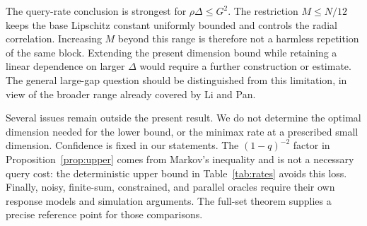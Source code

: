 \documentclass[11pt,a4paper]{article}
\theoremstyle{definition}
\numberwithin{equation}{section}
\begin{document}
The query-rate conclusion is strongest for $\rho\Delta\le G^2$. The
restriction $M\le N/12$ keeps the base Lipschitz constant uniformly bounded
and controls the radial correlation. Increasing $M$ beyond this range is
therefore not a harmless repetition of the same block. Extending the
present dimension bound while retaining a linear dependence on larger
$\Delta$ would require a further construction or estimate. The general
large-gap question should be distinguished from this limitation, in view
of the broader range already covered by Li and Pan.

Several issues remain outside the present result. We do not determine the
optimal dimension needed for the lower bound, or the minimax rate at a
prescribed small dimension. Confidence is fixed in our statements. The
$(1-q)^{-2}$ factor in Proposition~\ref{prop:upper} comes from Markov's
inequality and is not a necessary query cost: the deterministic upper
bound in Table~\ref{tab:rates} avoids this loss. Finally, noisy, finite-sum, constrained, and
parallel oracles require their own response models and simulation
arguments. The full-set theorem supplies a precise reference point for
those comparisons.
\end{document}
